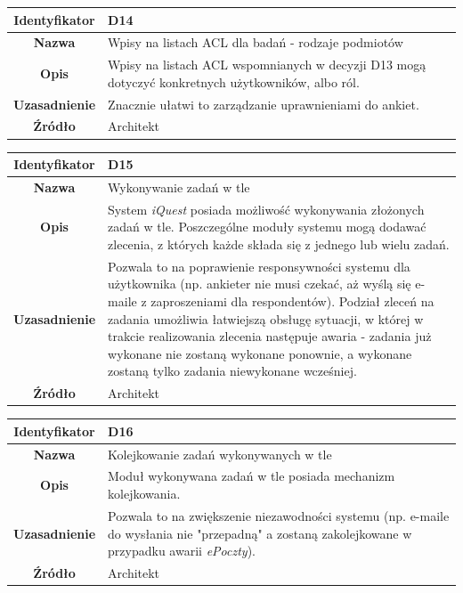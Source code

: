 \begin{table}[H]
\centering
\begin{tabular}{ | >{\bfseries}c | p{11cm} | }
\hline
%
Identyfikator & D14 \\ \hline
Nazwa & Wpisy na listach ACL dla badań - rodzaje podmiotów \\ \hline
Opis & Wpisy na listach ACL wspomnianych w decyzji D13 mogą dotyczyć konkretnych użytkowników, albo ról. \\ \hline
Uzasadnienie & Znacznie ułatwi to zarządzanie uprawnieniami do ankiet. \\ \hline
Źródło & Architekt \\ \hline
%
\end{tabular}
\end{table}

\begin{table}[H]
\centering
\begin{tabular}{ | >{\bfseries}c | p{11cm} | }
\hline
%
Identyfikator & D15 \\ \hline
Nazwa & Wykonywanie zadań w tle \\ \hline
Opis & System \textit{iQuest} posiada możliwość wykonywania złożonych zadań w tle. Poszczególne moduły systemu mogą dodawać zlecenia, z których każde składa się z jednego lub wielu zadań. \\ \hline
Uzasadnienie & Pozwala to na poprawienie responsywności systemu dla użytkownika (np. ankieter nie musi czekać, aż wyślą się e-maile z zaproszeniami dla respondentów). Podział zleceń na zadania umożliwia łatwiejszą obsługę sytuacji, w której w trakcie realizowania zlecenia następuje awaria - zadania już wykonane nie zostaną wykonane ponownie, a wykonane zostaną tylko zadania niewykonane wcześniej. \\ \hline
Źródło & Architekt \\ \hline
%
\end{tabular}
\end{table}

\begin{table}[H]
\centering
\begin{tabular}{ | >{\bfseries}c | p{11cm} | }
\hline
%
Identyfikator & D16 \\ \hline
Nazwa & Kolejkowanie zadań wykonywanych w tle \\ \hline
Opis & Moduł wykonywana zadań w tle posiada mechanizm kolejkowania. \\ \hline
Uzasadnienie & Pozwala to na zwiększenie niezawodności systemu (np. e-maile do wysłania nie "przepadną" a zostaną zakolejkowane w przypadku awarii \textit{ePoczty}). \\ \hline
Źródło & Architekt \\ \hline
%
\end{tabular}
\end{table}

